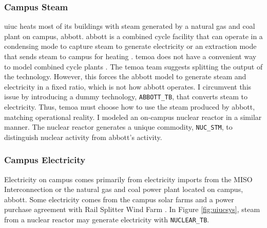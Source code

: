 \subsubsection{Campus Steam}
\gls{uiuc} heats most of its buildings with steam generated by a natural gas and
coal plant on campus, \gls{abbott}. \gls{abbott} is a combined cycle facility that
can operate in a condensing mode to capture steam to generate electricity or an
extraction mode that sends steam to campus for heating
\cite{affiliated_engineers_inc_utilities_2015}. \gls{temoa} does not have a
convenient way to model combined cycle plants \cite{decarolis_temoa_2010}. The
\gls{temoa} team suggests splitting the output of the technology. However, this
forces the \gls{abbott} model to generate steam and electricity in a fixed ratio, which
is not how \gls{abbott} operates. I circumvent this issue by introducing a dummy
technology, \texttt{ABBOTT\_TB}, that converts steam to electricity. Thus, \gls{temoa}
must choose how to use the steam produced by \gls{abbott}, matching operational reality.
I modeled an on-campus nuclear reactor in a similar manner. The nuclear reactor
generates a unique commodity, \texttt{NUC\_STM}, to distinguish nuclear activity
from \gls{abbott}'s activity.


\subsubsection{Campus Electricity}

Electricity on campus comes primarily from electricity imports from the MISO
Interconnection or the natural gas and coal power plant located on campus,
\gls{abbott}. Some electricity comes from the campus solar farms and a power purchase
agreement with Rail Splitter Wind Farm
\cite{institute_for_sustainability_energy_and_environment_illinois_2015,breitweiser_wind_2016,white_solar_2017}.
In Figure \ref{fig:uiucsys}, steam from a nuclear reactor may generate
electricity with \texttt{NUCLEAR\_TB}.


